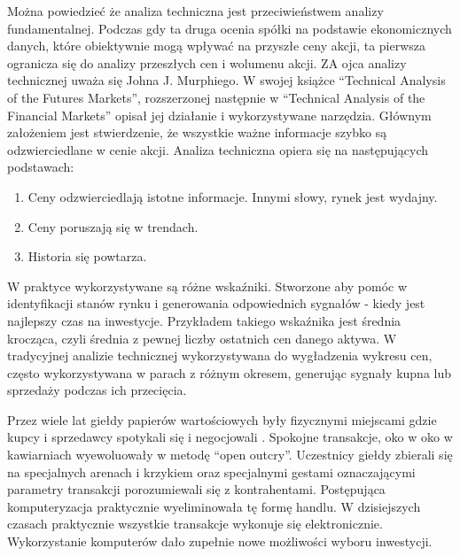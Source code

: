 \documentclass[twoside]{iisthesis}
\begin{document}
Można powiedzieć że analiza techniczna jest przeciwieństwem analizy fundamentalnej. Podczas gdy ta druga ocenia spółki na podstawie ekonomicznych danych, które obiektywnie mogą wpływać na przyszłe ceny akcji, ta pierwsza ogranicza się do analizy przeszłych cen i wolumenu akcji. ZA ojca analizy technicznej uważa się Johna J. Murphiego. W swojej książce ``Technical Analysis of the Futures Markets'', rozszerzonej następnie w ``Technical Analysis of the Financial Markets''  \cite{Murphy} opisał jej działanie i wykorzystywane narzędzia. Głównym założeniem jest stwierdzenie, że wszystkie ważne informacje szybko są odzwierciedlane w cenie akcji. Analiza techniczna opiera się na następujących podstawach:

\begin{enumerate}
\item Ceny odzwierciedlają istotne informacje. Innymi słowy, rynek jest wydajny.
\item Ceny poruszają się w trendach.
\item Historia się powtarza.
\end{enumerate}

W praktyce wykorzystywane są różne wskaźniki. Stworzone aby pomóc w identyfikacji stanów rynku i generowania odpowiednich sygnałów - kiedy jest najlepszy czas na inwestycje. Przykładem takiego wskaźnika jest średnia krocząca, czyli średnia z pewnej liczby ostatnich cen danego aktywa. W tradycyjnej analizie technicznej wykorzystywana do wygładzenia wykresu cen, często wykorzystywana w parach z różnym okresem, generując sygnały kupna lub sprzedaży podczas ich przecięcia.

Przez wiele lat giełdy papierów wartościowych były fizycznymi miejscami gdzie kupcy i sprzedawcy spotykali się i negocjowali \cite{openOutcry}. Spokojne transakcje, oko w oko w kawiarniach wyewoluowały w metodę ``open outcry''. Uczestnicy giełdy zbierali się na specjalnych arenach i krzykiem oraz specjalnymi gestami oznaczającymi parametry transakcji porozumiewali się z kontrahentami. Postępująca komputeryzacja praktycznie wyeliminowała tę formę handlu. W dzisiejszych czasach praktycznie wszystkie transakcje wykonuje się elektronicznie. Wykorzystanie komputerów dało zupełnie nowe możliwości wyboru inwestycji. 
\end{document}
